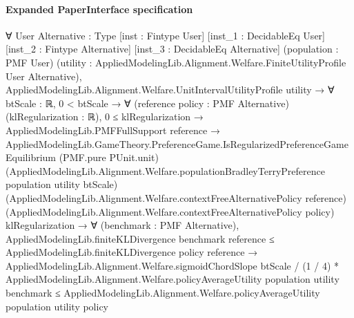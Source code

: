 \documentclass[10pt]{article}
\begin{document}
\paragraph{Expanded PaperInterface specification}
\begin{ReviewVerbatim}
∀ {User Alternative : Type} [inst : Fintype User] [inst_1 : DecidableEq User] [inst_2 : Fintype Alternative]
  [inst_3 : DecidableEq Alternative] (population : PMF User)
  (utility : AppliedModelingLib.Alignment.Welfare.FiniteUtilityProfile User Alternative),
  AppliedModelingLib.Alignment.Welfare.UnitIntervalUtilityProfile utility →
    ∀ {btScale : ℝ},
      0 < btScale →
        ∀ (reference policy : PMF Alternative) (klRegularization : ℝ),
          0 ≤ klRegularization →
            AppliedModelingLib.PMFFullSupport reference →
              AppliedModelingLib.GameTheory.PreferenceGame.IsRegularizedPreferenceGameEquilibrium (PMF.pure PUnit.unit)
                  (AppliedModelingLib.Alignment.Welfare.populationBradleyTerryPreference population utility btScale)
                  (AppliedModelingLib.Alignment.Welfare.contextFreeAlternativePolicy reference)
                  (AppliedModelingLib.Alignment.Welfare.contextFreeAlternativePolicy policy) klRegularization →
                ∀ (benchmark : PMF Alternative),
                  AppliedModelingLib.finiteKLDivergence benchmark reference ≤
                      AppliedModelingLib.finiteKLDivergence policy reference →
                    AppliedModelingLib.Alignment.Welfare.sigmoidChordSlope btScale / (1 / 4) *
                        AppliedModelingLib.Alignment.Welfare.policyAverageUtility population utility benchmark ≤
                      AppliedModelingLib.Alignment.Welfare.policyAverageUtility population utility policy
\end{ReviewVerbatim}
\end{document}
